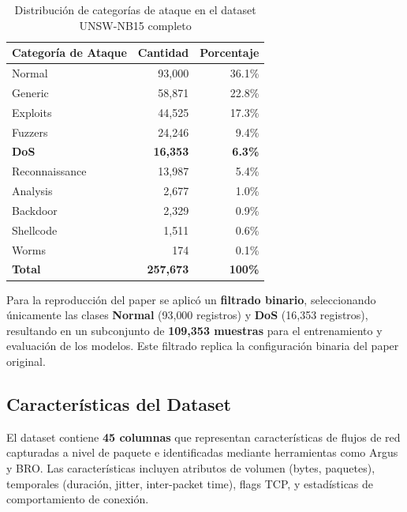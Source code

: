\documentclass[12pt,a4paper]{article}
\begin{document}
\begin{table}[H]
\centering
\caption{Distribución de categorías de ataque en el dataset UNSW-NB15 completo}
\label{tab:distribucion}
\begin{tabular}{lrr}
\toprule
\textbf{Categoría de Ataque} & \textbf{Cantidad} & \textbf{Porcentaje} \\
\midrule
Normal        & 93{,}000  & 36.1\% \\
Generic       & 58{,}871  & 22.8\% \\
Exploits      & 44{,}525  & 17.3\% \\
Fuzzers       & 24{,}246  &  9.4\% \\
\textbf{DoS}  & \textbf{16{,}353} & \textbf{6.3\%} \\
Reconnaissance & 13{,}987 &  5.4\% \\
Analysis      &  2{,}677  &  1.0\% \\
Backdoor      &  2{,}329  &  0.9\% \\
Shellcode     &  1{,}511  &  0.6\% \\
Worms         &    174    &  0.1\% \\
\midrule
\textbf{Total} & \textbf{257{,}673} & \textbf{100\%} \\
\bottomrule
\end{tabular}
\end{table}

\begin{cajaInfo}
Para la reproducción del paper se aplicó un \textbf{filtrado binario}, seleccionando únicamente
las clases \textbf{Normal} (93{,}000 registros) y \textbf{DoS} (16{,}353 registros), resultando
en un subconjunto de \textbf{109{,}353 muestras} para el entrenamiento y evaluación de los modelos.
Este filtrado replica la configuración binaria del paper original.
\end{cajaInfo}

\subsection{Características del Dataset}

El dataset contiene \textbf{45 columnas} que representan características de flujos de red capturadas
a nivel de paquete e identificadas mediante herramientas como Argus y BRO. Las características
incluyen atributos de volumen (bytes, paquetes), temporales (duración, jitter, inter-packet time),
flags TCP, y estadísticas de comportamiento de conexión.

\end{document}

